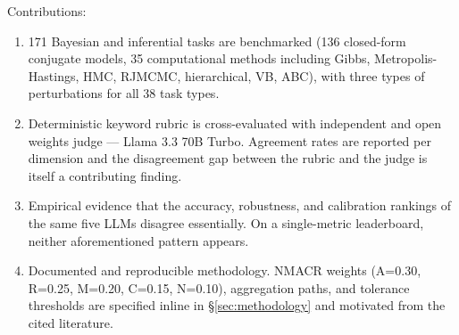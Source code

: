 Contributions:
\begin{enumerate}
  \item 171 Bayesian and inferential tasks are benchmarked (136
        closed-form conjugate models, 35 computational methods
        including Gibbs, Metropolis-Hastings, HMC, RJMCMC,
        hierarchical, VB, ABC), with three types of perturbations
        for all 38 task types.
  \item Deterministic keyword rubric is cross-evaluated with
        independent and open weights judge --- Llama 3.3 70B Turbo.
        Agreement rates are reported per dimension and the
        disagreement gap between the rubric and the judge is itself
        a contributing finding.
  \item Empirical evidence that the accuracy, robustness, and
        calibration rankings of the same five LLMs disagree
        essentially. On a single-metric leaderboard, neither
        aforementioned pattern appears.
  \item Documented and reproducible methodology. NMACR weights
        (A=0.30, R=0.25, M=0.20, C=0.15, N=0.10), aggregation paths,
        and tolerance thresholds are specified inline in \S\ref{sec:methodology}
        and motivated from the cited literature.
\end{enumerate}
